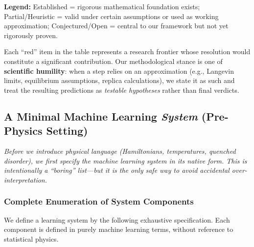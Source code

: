 \documentclass[
  journal=largetwo,
  simfonts=false,
  year=2025,
  volume=37,
]{cup-journal}
\begin{document}
\noindent\textbf{Legend:} \textcolor{green!60!black}{Established} = rigorous mathematical foundation exists; \textcolor{orange!80!black}{Partial/Heuristic} = valid under certain assumptions or used as working approximation; \textcolor{red!70!black}{Conjectured/Open} = central to our framework but not yet rigorously proven.

Each ``red'' item in the table represents a research frontier whose resolution would constitute a significant contribution. Our methodological stance is one of \textbf{scientific humility}: when a step relies on an approximation (e.g., Langevin limits, equilibrium assumptions, replica calculations), we state it as such and treat the resulting predictions as \textit{testable hypotheses} rather than final verdicts.

\subsection{A Minimal Machine Learning \textit{System} (Pre-Physics Setting)}\label{sec:ml_system_pre_physics}

\textit{Before we introduce physical language (Hamiltonians, temperatures, quenched disorder), we first specify the machine learning system \emph{in its native form}. This is intentionally a ``boring'' list---but it is the only safe way to avoid accidental over-interpretation.}


\subsubsection{Complete Enumeration of System Components}

We define a learning system by the following exhaustive specification. Each component is defined in purely machine learning terms, without reference to statistical physics.
\end{document}
